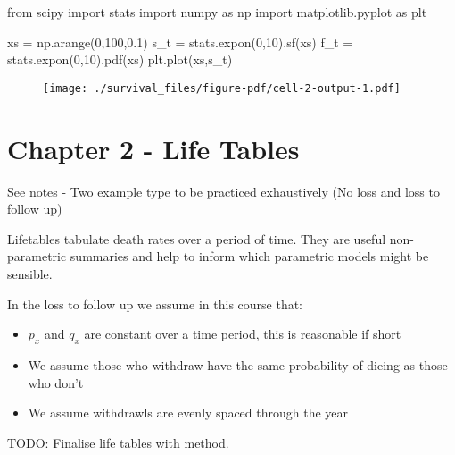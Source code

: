 \documentclass[
  letterpaper,
  DIV=11,
  numbers=noendperiod]{scrreprt}
\newenvironment{Shaded}{\begin{snugshade}}{\end{snugshade}}
\newcommand{\DecValTok}[1]{\textcolor[rgb]{0.68,0.00,0.00}{#1}}
\newcommand{\FloatTok}[1]{\textcolor[rgb]{0.68,0.00,0.00}{#1}}
\newcommand{\ImportTok}[1]{\textcolor[rgb]{0.00,0.46,0.62}{#1}}
\newcommand{\NormalTok}[1]{\textcolor[rgb]{0.00,0.23,0.31}{#1}}
\newcommand{\OperatorTok}[1]{\textcolor[rgb]{0.37,0.37,0.37}{#1}}
\providecommand{\tightlist}{%
  \setlength{\itemsep}{0pt}\setlength{\parskip}{0pt}}\usepackage{longtable,booktabs,array}
\begin{document}
\begin{Shaded}
\begin{Highlighting}[]
\ImportTok{from}\NormalTok{ scipy }\ImportTok{import}\NormalTok{ stats}
\ImportTok{import}\NormalTok{ numpy }\ImportTok{as}\NormalTok{ np}
\ImportTok{import}\NormalTok{ matplotlib.pyplot }\ImportTok{as}\NormalTok{ plt}

\NormalTok{xs }\OperatorTok{=}\NormalTok{ np.arange(}\DecValTok{0}\NormalTok{,}\DecValTok{100}\NormalTok{,}\FloatTok{0.1}\NormalTok{)}
\NormalTok{s\_t }\OperatorTok{=}\NormalTok{ stats.expon(}\DecValTok{0}\NormalTok{,}\DecValTok{10}\NormalTok{).sf(xs)}
\NormalTok{f\_t }\OperatorTok{=}\NormalTok{ stats.expon(}\DecValTok{0}\NormalTok{,}\DecValTok{10}\NormalTok{).pdf(xs)}
\NormalTok{plt.plot(xs,s\_t)}
\end{Highlighting}
\end{Shaded}

\begin{figure}[H]

{\centering \texttt{[image: ./survival\_files/figure-pdf/cell-2-output-1.pdf]}

}

\end{figure}

\hypertarget{chapter-2---life-tables}{%
\section{Chapter 2 - Life Tables}\label{chapter-2---life-tables}}

See notes - Two example type to be practiced exhaustively (No loss and
loss to follow up)

Lifetables tabulate death rates over a period of time. They are useful
non-parametric summaries and help to inform which parametric models
might be sensible.

In the loss to follow up we assume in this course that:

\begin{itemize}
\tightlist
\item
  \(p_x\) and \(q_x\) are constant over a time period, this is
  reasonable if short
\item
  We assume those who withdraw have the same probability of dieing as
  those who don't
\item
  We assume withdrawls are evenly spaced through the year
\end{itemize}

TODO: Finalise life tables with method.
\end{document}
